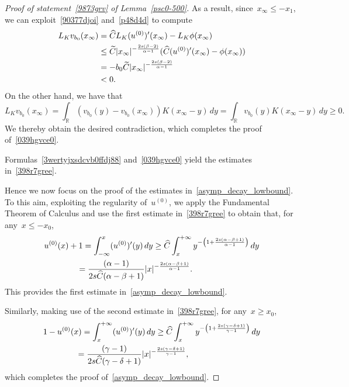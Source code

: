 \documentclass[10pt,a4paper]{amsart}
\numberwithin{equation}{section}
\newcommand{\R}{\mathbb{R}}
\begin{document}
\begin{proof}[Proof of statement~\eqref{9873grv} of Lemma~\ref{psc0-500}]
As a result, since~$x_{\infty}\leq -x_1$, we can exploit~\eqref{90377djoi} and~\eqref{p48d4d} to compute
\begin{equation*}
\begin{split}
L_K v_{b_0} ({x_{\infty}}) &= \widehat{C} L_K (u^{(0)})\rq{}({x_{\infty}}) -  L_K \phi ({x_{\infty}})\\
&\leq \widetilde{C} | {x_{\infty}} |^{-\frac{2s(\beta-2)}{\alpha-1}} (\widehat{C} (u^{(0)})\rq{}({x_{\infty}}) - \phi ({x_{\infty}}))\\
&= - b_0 \widetilde{C}| {x_{\infty}}|^{-\frac{2s(\beta-2)}{\alpha-1}}\\&<0.
\end{split}
\end{equation*}
On the other hand, we have that
\begin{equation*}
L_K v_{b_0} ({x_{\infty}}) = \int_{\R} (v_{b_0}(y)-v_{b_0}({x_{\infty}})) K({x_{\infty}}-y) \, dy = \int_{\R} v_{b_0}(y) K({x_{\infty}}-y) \, dy \geq 0.
\end{equation*}
We thereby obtain the desired contradiction, which completes the proof of~\eqref{039hgvce0}.

Formulas~\eqref{3wertyjxsdcvb0ffdj88} and~\eqref{039hgvce0} yield the estimates in~\eqref{398r7gree}.

Hence we now focus on the proof of the estimates in~\eqref{asymp_decay_lowbound}. To this aim, exploiting the regularity of~$u^{(0)}$, we apply the Fundamental Theorem of Calculus 
and use the first estimate in~\eqref{398r7gree} to obtain that, for any~$x \leq -x_0$,
\begin{equation*}
\begin{split}&
u^{(0)}(x)+1 = \int_{-\infty}^x (u^{(0)})\rq{}(y) \, dy \geq  \widehat{C}\int_{x}^{+\infty}  y^{-\left( 1+\frac{2s(\alpha-\beta+1)}{\alpha-1}\right)}\, dy\\ &\qquad\qquad= \frac{(\alpha-1)}{2s\widehat{C}(\alpha-\beta+1)} | x |^{-\frac{2s(\alpha-\beta+1)}{\alpha-1}}.
\end{split}
\end{equation*}
This provides the first estimate in~\eqref{asymp_decay_lowbound}.

Similarly, making use of the second estimate in~\eqref{398r7gree},
for any~$x \geq x_0$,
\begin{equation*}
\begin{split}&
1- u^{(0)}(x) =  \int_{x}^{+\infty} (u^{(0)})\rq{}(y) \, dy \geq {\widehat{C}}\int_{x}^{+\infty}  y^{-\left( 1+\frac{2s(\gamma-\delta+1)}{\gamma-1}\right)}\, dy\\ &\qquad\qquad= \frac{(\gamma-1)}{2s\widehat{C}(\gamma-\delta+1)} |x |^{-\frac{2s(\gamma-\delta+1)}{\gamma-1}},
\end{split}
\end{equation*} which completes the proof of~\eqref{asymp_decay_lowbound}.
\end{proof}
\end{document}
